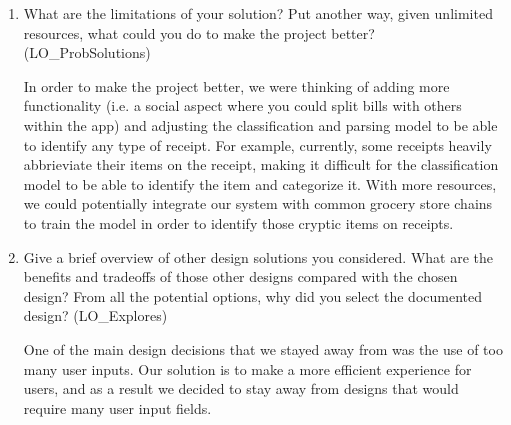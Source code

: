 \documentclass[12pt, titlepage]{article}
\begin{document}
\begin{enumerate}
  \item What are the limitations of your solution?  Put another way, given
  unlimited resources, what could you do to make the project better? (LO\_ProbSolutions)

  In order to make the project better, we were thinking of adding more functionality (i.e. a social aspect where you could split bills with others within the app) and adjusting the classification
  and parsing model to be able to identify any type of receipt. For example, currently, some receipts heavily abbrieviate their items on the receipt, making it difficult for the classification model
  to be able to identify the item and categorize it. With more resources, we could potentially integrate our system with common grocery store chains to train the model in order to identify those
  cryptic items on receipts.

  \item Give a brief overview of other design solutions you considered.  What
  are the benefits and tradeoffs of those other designs compared with the chosen
  design?  From all the potential options, why did you select the documented design?
  (LO\_Explores)

  One of the main design decisions that we stayed away from was the use of too many user inputs. Our solution is to make a more efficient experience for users, and as a result we decided to stay
  away from designs that would require many user input fields. 

\end{enumerate}
\end{document}
